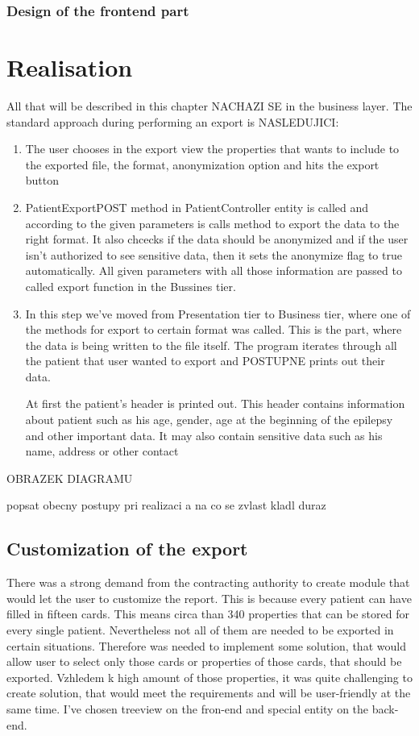 \documentclass[thesis=B,english]{FITthesis}[2012/10/20]
\begin{document}
\subsection{Design of the frontend part}


	\chapter{Realisation}
All that will be described in this chapter NACHAZI SE in the business layer. The standard approach during performing an export is NASLEDUJICI:

\begin{enumerate}
\item{ The user chooses in the export view the properties that wants to include to the exported file, the format, anonymization option and hits the export button }
\item{ PatientExportPOST method in PatientController entity is called and according to the given parameters is calls method to export the data to the right format. It also chcecks if the data should be anonymized and if the user isn't authorized to see sensitive data, then it sets the anonymize flag to true automatically. All given parameters with all those information are passed to called export function in the Bussines tier.}
\item{ In this step we've moved from Presentation tier to Business tier, where one of the methods for export to certain format was called. This is the part, where the data is being written to the file itself. The program iterates through all the patient that user wanted to export and POSTUPNE prints out their data. 

At first the patient's header is printed out. This header contains information about patient such as his age, gender, age at the beginning of the epilepsy and other important data. It may also contain sensitive data such as his name, address or other contact 
}


\end{enumerate}


OBRAZEK DIAGRAMU

popsat obecny postupy pri realizaci a na co se zvlast kladl duraz
\section{Customization of the export}
There was a strong demand from the contracting authority to create module that would  let the user to customize the report. This is because every patient can have filled in fifteen cards. This means circa than 340 properties that can be stored for every single patient. Nevertheless not all of them are needed to be exported in certain situations. Therefore was needed to implement some solution, that would allow user to select only those cards or properties of those cards, that should be exported.
Vzhledem k high amount of those properties, it was quite challenging to create solution, that would meet the requirements and will be user-friendly at the same time. I've chosen treeview on the fron-end and special entity on the back-end.
\end{document}
